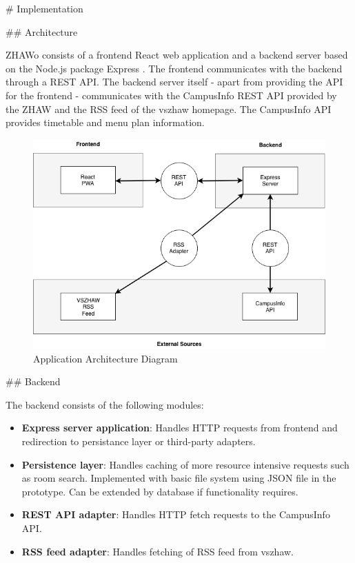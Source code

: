 \begin{markdown}

# Implementation

## Architecture

ZHAWo consists of a frontend React \cite{React} web application and a backend server based on the Node.js \cite{Node} package Express \cite{Express}. The frontend communicates with the backend through a REST API. The backend server itself - apart from providing the API for the frontend - communicates with the CampusInfo REST API provided by the ZHAW and the RSS feed of the vszhaw homepage. The CampusInfo API provides timetable and menu plan information.

\bigskip

\begin{figure}[H]
  \includegraphics[width=14cm, center]{../diagrams/applicationArchitecture.png}
  \caption{\textsf{Application Architecture Diagram}}
\end{figure}

\bigskip

## Backend

The backend consists of the following modules:

\begin{itemize}
  \item \textbf{Express server application}: Handles HTTP requests from frontend and redirection to persistance layer or third-party adapters.
  \item \textbf{Persistence layer}: Handles caching of more resource intensive requests such as room search. Implemented with basic file system using JSON file in the prototype. Can be extended by database if functionality requires.
  \item \textbf{REST API adapter}: Handles HTTP fetch requests to the CampusInfo API.
  \item \textbf{RSS feed adapter}: Handles fetching of RSS feed from vszhaw.
\end{itemize}


\end{markdown}
